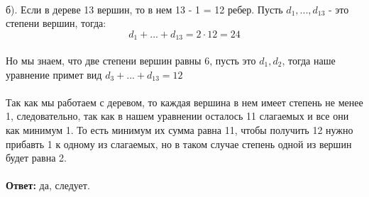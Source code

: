 \documentclass[a4paper, 12pt]{article}
\begin{document}
    \\
    \\
    \\ б). Если в дереве 13 вершин, то в нем 13 - 1 = 12 ребер. Пусть $d_1, ..., d_{13}$ - это степени вершин, тогда:
    \[ d_1 + ... + d_{13} = 2 \cdot 12 = 24 \]
    \\ Но мы знаем, что две степени вершин равны 6, пусть это $d_1, d_2$, тогда наше уравнение примет вид $d_3 + ... + d_{13} = 12$
    \\
    \\ Так как мы работаем с деревом, то каждая вершина в нем имеет степень не менее 1, следовательно, так как в нашем уравнении осталось 11 слагаемых и все они как минимум 1. То есть минимум их сумма равна 11, чтобы получить 12 нужно прибавть 1 к одному из слагаемых, но в таком случае степень одной из вершин будет равна 2.
    \\
    \\ \textbf{Ответ: } да, следует.
\end{document}
